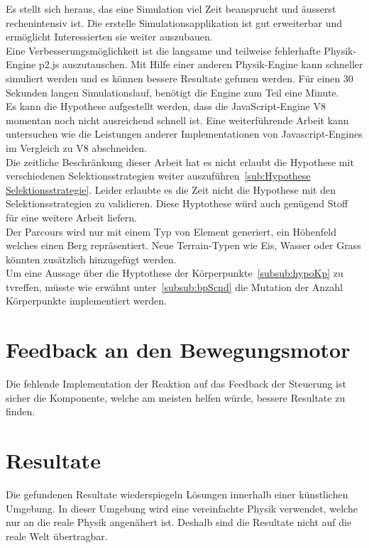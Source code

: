     Es stellt sich heraus, das eine Simulation viel Zeit beansprucht und äusserst rechenintensiv ist.
    Die erstelle Simulationsapplikation ist gut erweiterbar und ermöglicht Interessierten sie weiter auszubauen.
    \\
    Eine Verbesserungsmöglichkeit ist die langsame und teilweise fehlerhafte Physik-Engine p2.js auszutauschen.
    Mit Hilfe einer anderen Physik-Engine kann schneller simuliert werden und es können bessere Resultate gefunen werden.
    Für einen 30 Sekunden langen Simulationslauf, benötigt die Engine zum Teil eine Minute.
    \\
    Es kann die Hypothese aufgestellt werden, dass die JavaScript-Engine V8 momentan noch nicht ausreichend schnell ist.
    Eine weiterführende Arbeit kann untersuchen wie die Leistungen anderer Implementationen von Javascript-Engines im
    Vergleich zu V8 abschneiden.
    \\
    Die zeitliche Beschränkung dieser Arbeit hat es nicht erlaubt
    die Hypothese mit verschiedenen Selektionsstrategien weiter auszuführen~\vref{sub:Hypothese Selektionsstrategie}.
    Leider erlaubte es die Zeit nicht die Hypothese mit den Selektionsstrategien zu validieren.
    Diese Hyptothese würd auch genügend Stoff für eine weitere Arbeit liefern.
    \\
    Der Parcours wird nur mit einem Typ von Element generiert, ein Höhenfeld welches einen Berg repräsentiert.
    Neue Terrain-Typen wie Eis, Wasser oder Grass könnten zusätzlich hinzugefügt werden.
    \\
    Um eine Aussage über die Hyptothese der Körperpunkte~\vref{subsub:hypoKp} zu tvreffen,
    müsste wie erwähnt unter~\vref{subsub:bpScnd} die Mutation der Anzahl Körperpunkte implementiert werden.

  \section{Feedback an den Bewegungsmotor\label{sec:PerspectiveFeedback}}

    Die fehlende Implementation der Reaktion auf das Feedback der Steuerung ist sicher die Komponente,
    welche am meisten helfen würde, bessere Resultate zu finden.

  \section{Resultate}

    Die gefundenen Resultate wiederspiegeln Lösungen innerhalb einer künstlichen Umgebung.
    In dieser Umgebung wird eine vereinfachte Physik verwendet, welche nur an die reale Physik angenähert ist.
    Deshalb sind die Resultate nicht auf die reale Welt übertragbar.

